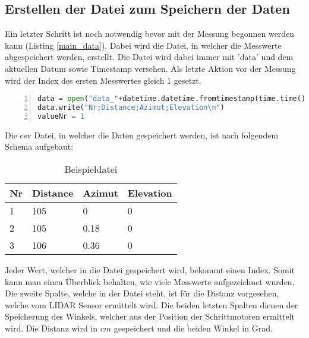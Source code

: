 \subsection{Erstellen der Datei zum Speichern der Daten}
Ein letzter Schritt ist noch notwendig bevor mit der Messung begonnen werden kann (Listing \ref{main_data}). Dabei wird die Datei, in welcher die Messwerte abgespeichert werden, erstellt. Die Datei wird dabei immer mit 'data' und dem aktuellen Datum sowie Timestamp versehen. Als letzte Aktion vor der Messung wird der Index des ersten Messwertes gleich 1 gesetzt.\\
\begin{lstlisting}[caption={Erstellen der Datei zum Speichern der Daten}, language={Python}, label={main_data}, numbers=left]
data = open("data_"+datetime.datetime.fromtimestamp(time.time()).strftime('%Y-%m-%d_%H-%M-%S')+".csv", "w")
data.write("Nr;Distance;Azimut;Elevation\n")
valueNr = 1
\end{lstlisting}
Die \ac{csv} Datei, in welcher die Daten gespeichert werden, ist nach folgendem Schema aufgebaut:
\begin{table}[H]
	\centering
	\caption{Beispieldatei}
	\begin{tabular}{|l|l|l|l|}
		\hline
		\textbf{Nr} & \textbf{Distance} & \textbf{Azimut} & \textbf{Elevation} \\\hline
		1  & 105      & 0       & 0         \\\hline
		2  & 105      & 0.18       & 0      \\\hline
		3  & 106      & 0.36       & 0      \\\hline
	\end{tabular}
\end{table}
Jeder Wert, welcher in die Datei gespeichert wird, bekommt einen Index. Somit kann man einen Überblick behalten, wie viele Messwerte aufgezeichnet wurden. Die zweite Spalte, welche in der Datei steht, ist für die Distanz vorgesehen, welche vom \ac{LIDAR} Sensor ermittelt wird. Die beiden letzten Spalten dienen der Speicherung des Winkels, welcher aus der Position der Schrittmotoren ermittelt wird. Die Distanz wird in $cm$ gespeichert und die beiden Winkel in Grad.

